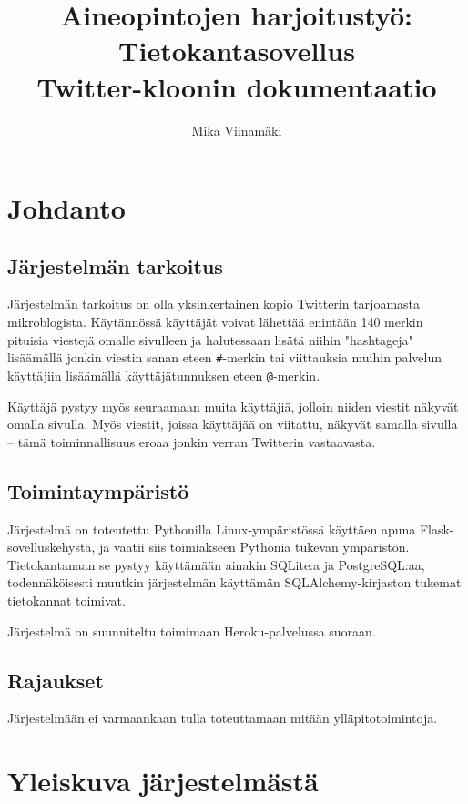 \documentclass{article}
\begin{document}
\title{Aineopintojen harjoitustyö: Tietokantasovellus \\ Twitter-kloonin dokumentaatio}
\author{Mika Viinamäki}
\maketitle
\thispagestyle{empty}

\newpage

\tableofcontents
\newpage

\section{Johdanto}

\subsection {Järjestelmän tarkoitus}
Järjestelmän tarkoitus on olla yksinkertainen kopio Twitterin tarjoamasta mikroblogista. Käytännössä käyttäjät voivat lähettää enintään 140 merkin pituisia viestejä omalle sivulleen ja halutessaan lisätä niihin "hashtageja" lisäämällä jonkin viestin sanan eteen \verb+#+-merkin tai viittauksia muihin palvelun käyttäjiin lisäämällä käyttäjätunnuksen eteen \verb+@+-merkin.

Käyttäjä pystyy myös seuraamaan muita käyttäjiä, jolloin niiden viestit näkyvät omalla sivulla. Myös viestit, joissa käyttäjää on viitattu, näkyvät samalla sivulla -- tämä toiminnallisuus eroaa jonkin verran Twitterin vastaavasta.

\subsection{Toimintaympäristö}
Järjestelmä on toteutettu Pythonilla Linux-ympäristössä käyttäen apuna Flask-sovelluskehystä, ja vaatii siis toimiakseen Pythonia tukevan ympäristön. Tietokantanaan se pystyy käyttämään ainakin SQLite:a ja PostgreSQL:aa, todennäköisesti muutkin järjestelmän käyttämän SQLAlchemy-kirjaston tukemat tietokannat toimivat.

Järjestelmä on suunniteltu toimimaan Heroku-palvelussa suoraan.

\subsection{Rajaukset}
Järjestelmään ei varmaankaan tulla toteuttamaan mitään ylläpitotoimintoja.

\section{Yleiskuva järjestelmästä}
\end{document}
